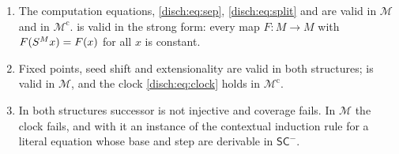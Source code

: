 \begin{lemma}
\label{disch:lem:sc-model}
\begin{enumerate}[label=\textup{(\alph*)}]
\item The computation equations, \eqref{disch:eq:sep}, \eqref{disch:eq:split}
 and  are valid in $\mathcal M$ and in
 $\mathcal M^{\mathrm c}$.  is valid in the strong form: every
 map $F:M\to M$ with $F(S^M x)=F(x)$ for all $x$ is constant.
\item Fixed points, seed shift and extensionality are valid in both
 structures;  is valid in $\mathcal M$, and the clock
 \eqref{disch:eq:clock} holds in $\mathcal M^{\mathrm c}$.
\item In both structures successor is not injective and coverage fails. In
 $\mathcal M$ the clock fails, and with it an instance of the contextual
 induction rule for a literal equation whose base and step are derivable in
 $\mathsf{SC}^{-}$.
\end{enumerate}
\end{lemma}

